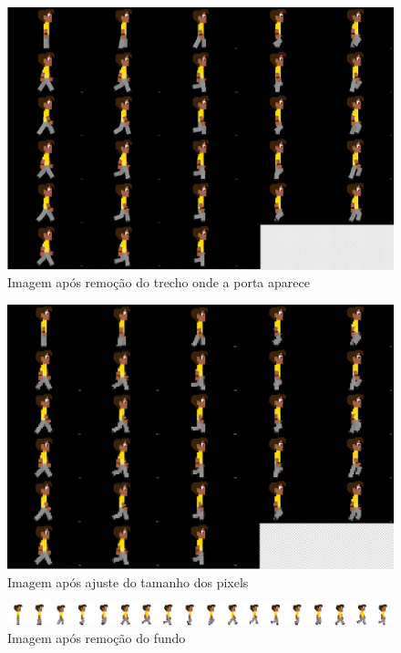 \begin{figure}[htbp]
    \centering
    \caption{\small Imagem após remoção do trecho onde a porta aparece}
    \label{fig:geminiProAbrirPortaCorte}
    \includegraphics[width=0.7\linewidth]{figs/geminiPro/sprite sheet/walking_grande.PNG}
\end{figure}

\begin{figure}[htbp]
    \centering
    \caption{\small Imagem após ajuste do tamanho dos pixels}
    \label{fig:geminiProAbrirPortaPixel}
    \includegraphics[width=0.7\linewidth]{figs/geminiPro/sprite sheet/walking_ajustado.PNG}
\end{figure}

\begin{figure}[htbp]
    \centering
    \caption{\small Imagem após remoção do fundo}
    \label{fig:geminiProAbrirPortaSemFundo}
    \includegraphics[width=1\linewidth]{figs/geminiPro/sprite sheet/walking_sprite_sheet_grande.png}
\end{figure}

